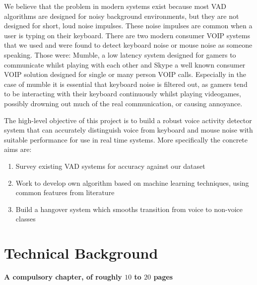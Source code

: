 \documentclass[ %
                    author={Sam Phippen},
                supervisor={Dr. Rafal Bogacz},
                     title={Real time voice activity detectors in noisy personal computing environments},
                  subtitle={},
                    degree={MEng},
                      year={2012} ]{thesis}
\begin{document}
We believe that the problem in modern systems exist because most VAD algorithms
are designed for noisy background environments\cite{shin}, but they are not
designed for short, loud noise impulses. These noise impulses are common when a
user is typing on their keyboard. There are two modern consumer VOIP systems
that we used and were found to detect keyboard noise or mouse noise as someone
speaking. Those were: Mumble\cite{mumble}, a low latency system designed for
gamers to communicate whilst playing with each other and
Skype\texttrademark\cite{skype} a well known consumer VOIP solution designed
for single or many person VOIP calls. Especially in the case of mumble it is
essential that keyboard noise is filtered out, as gamers tend to be interacting
with their keyboard continuously whilst playing videogames, possibly drowning
out much of the real communication, or causing annoyance.

The high-level objective of this project is to build a robust voice activity
detector system that can accurately distinguish voice from keyboard and mouse
noise with suitable performance for use in real time systems. More specifically
the concrete aims are:

\begin{enumerate}
    \item Survey existing VAD systems for accuracy against our dataset
    \item Work to develop own algorithm based on machine learning techniques,
          using common features from literature
    \item Build a hangover system which smooths transition from voice to 
          non-voice classes
\end{enumerate}




\chapter{Technical Background}
\label{chap:technical}

{\bf A compulsory chapter, of roughly $10$ to $20$ pages} 
\vspace{1cm} 

\noindent

%
\end{document}
